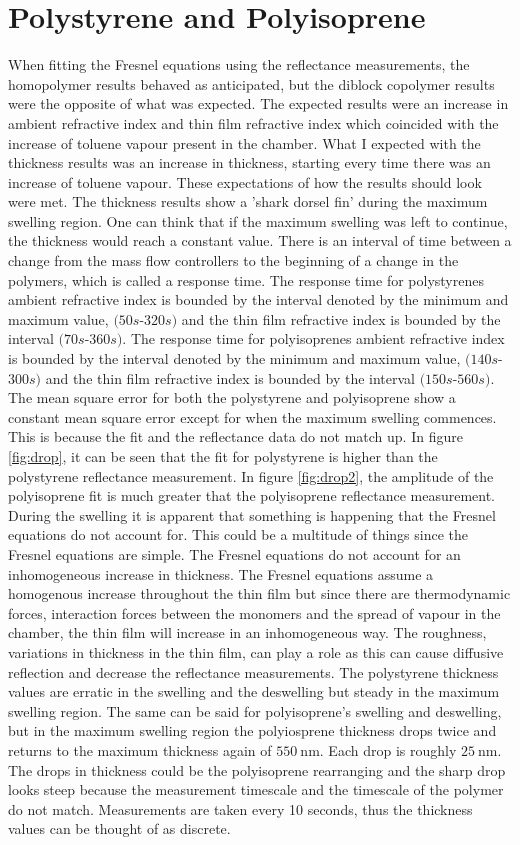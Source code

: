 \documentclass[MasterThesisMain.tex]{subfiles}
\begin{document}
\section{Polystyrene and Polyisoprene}
When fitting the Fresnel equations using the reflectance measurements, the homopolymer results behaved as anticipated, but the diblock copolymer results were the opposite of what was expected. The expected results were an increase in ambient refractive index and thin film refractive index which coincided with the increase of toluene vapour present in the chamber. What I expected with the thickness results was an increase in thickness, starting every time there was an increase of toluene vapour. These expectations of how the results should look were met. The thickness results show a 'shark dorsel fin' during the maximum swelling region. One can think that if the maximum swelling was left to continue, the thickness would reach a constant value. There is an interval of time between a change from the mass flow controllers to the beginning of a change in the polymers, which is called a response time. The response time for polystyrenes ambient refractive index is bounded by the interval denoted by the minimum and maximum value, $(50s$-$320s)$ and the thin film refractive index is bounded by the interval $(70s$-$360s)$.  The response time for polyisoprenes ambient refractive index is bounded by the interval denoted by the minimum and maximum value, $(140s$-$300s)$ and the thin film refractive index is bounded by the interval $(150s$-$560s)$. The mean square error for both the polystyrene and polyisoprene show a constant mean square error except for when the maximum swelling commences. This is because the fit and the reflectance data do not match up. In figure \ref{fig:drop}, it can be seen that the fit for polystyrene is higher than the polystyrene reflectance measurement. In figure \ref{fig:drop2}, the amplitude of the polyisoprene fit is much greater that the polyisoprene reflectance measurement. During the swelling it is apparent that something is happening that the Fresnel equations do not account for. This could be a multitude of things since the Fresnel equations are simple. The Fresnel equations do not account for an inhomogeneous increase in thickness. The Fresnel equations assume a homogenous increase throughout the thin film but since there are thermodynamic forces, interaction forces between the monomers and the spread of vapour in the chamber, the thin film will increase in an inhomogeneous way. The roughness, variations in thickness in the thin film, can play a role as this can cause diffusive reflection and decrease the reflectance measurements. The polystyrene thickness values are erratic in the swelling and the deswelling but steady in the maximum swelling region. The same can be said for polyisoprene's swelling and deswelling, but in the maximum swelling region the polyiosprene thickness drops twice and returns to the maximum thickness again of $\SI{550}{\nano\meter}$. Each drop is roughly $\SI{25}{\nano\meter}$. The drops in thickness could be the polyisoprene rearranging and the sharp drop looks steep because the measurement timescale and the timescale of the polymer do not match. Measurements are taken every 10 seconds, thus the thickness values can be thought of as discrete.
\end{document}
